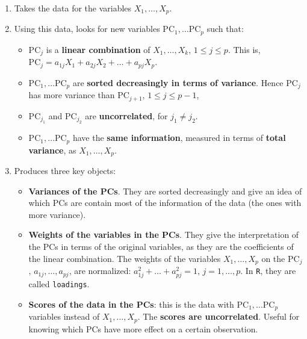 \documentclass[]{book}
\providecommand{\tightlist}{%
  \setlength{\itemsep}{0pt}\setlength{\parskip}{0pt}}
\theoremstyle{definition}
\theoremstyle{definition}
\theoremstyle{definition}
\theoremstyle{remark}
\begin{document}
\begin{enumerate}
\def\labelenumi{\arabic{enumi}.}
\tightlist
\item
  Takes the data for the variables \(X_1,\ldots,X_p\).
\item
  Using this data, looks for new variables
  \(\text{PC}_1,\ldots \text{PC}_p\) such that:

  \begin{itemize}
  \tightlist
  \item
    \(\text{PC}_j\) is a \textbf{linear combination} of
    \(X_1,\ldots,X_k\), \(1\leq j\leq p\). This is,
    \(\text{PC}_j=a_{1j}X_1+a_{2j}X_2+\ldots+a_{pj}X_p\).
  \item
    \(\text{PC}_1,\ldots \text{PC}_p\) are \textbf{sorted decreasingly
    in terms of variance}. Hence \(\text{PC}_j\) has more variance than
    \(\text{PC}_{j+1}\), \(1\leq j\leq p-1\),
  \item
    \(\text{PC}_{j_1}\) and \(\text{PC}_{j_2}\) are
    \textbf{uncorrelated}, for \(j_1\neq j_2\).
  \item
    \(\text{PC}_1,\ldots \text{PC}_p\) have the \textbf{same
    information}, measured in terms of \textbf{total variance}, as
    \(X_1,\ldots,X_p\).
  \end{itemize}
\item
  Produces three key objects:

  \begin{itemize}
  \tightlist
  \item
    \textbf{Variances of the PCs}. They are sorted decreasingly and give
    an idea of which PCs are contain most of the information of the data
    (the ones with more variance).
  \item
    \textbf{Weights of the variables in the PCs}. They give the
    interpretation of the PCs in terms of the original variables, as
    they are the coefficients of the linear combination. The weights of
    the variables \(X_1,\ldots,X_p\) on the PC\(_j\),
    \(a_{1j},\ldots,a_{pj}\), are normalized:
    \(a_{1j}^2+\ldots+a_{pj}^2=1\), \(j=1,\ldots,p\). In \texttt{R},
    they are called \texttt{loadings}.
  \item
    \textbf{Scores of the data in the PCs}: this is the data with
    \(\text{PC}_1,\ldots \text{PC}_p\) variables instead of
    \(X_1,\ldots,X_p\). The \textbf{scores are uncorrelated}. Useful for
    knowing which PCs have more effect on a certain observation.
  \end{itemize}
\end{enumerate}
\end{document}
